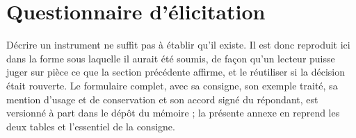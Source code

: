 

\chapter{Questionnaire d'élicitation}
\label{sec:questionnaire-reproduit}

Décrire un instrument ne suffit pas à établir qu'il existe. Il est donc reproduit ici dans la
forme sous laquelle il aurait été soumis, de façon qu'un lecteur puisse juger sur pièce ce que
la section précédente affirme, et le réutiliser si la décision était rouverte. Le formulaire
complet, avec sa consigne, son exemple traité, sa mention d'usage et de conservation et son
accord signé du répondant, est versionné à part dans le dépôt du mémoire ; la présente annexe en
reprend les deux tables et l'essentiel de la consigne.

